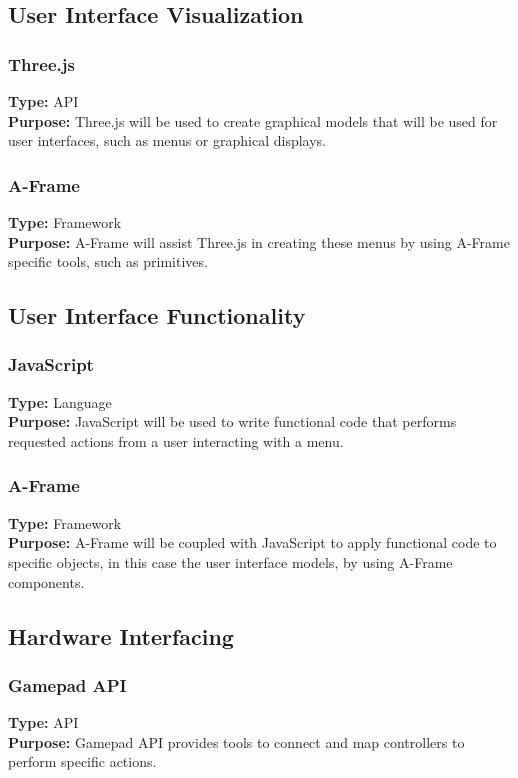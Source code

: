 \documentclass[onecolumn, draftclsnofoot,10pt, compsoc]{IEEEtran}
\begin{document}
\subsection{User Interface Visualization}
\subsubsection{Three.js}
\textbf{Type:} API\\
\textbf{Purpose:} Three.js will be used to create graphical models that will be used for user interfaces, such as menus or graphical displays.

\subsubsection{A-Frame}
\textbf{Type:} Framework\\ 
\textbf{Purpose:} A-Frame will assist Three.js in creating these menus by using A-Frame specific tools, such as primitives.

\subsection{User Interface Functionality}
\subsubsection{JavaScript}
\textbf{Type:} Language\\
\textbf{Purpose:} JavaScript will be used to write functional code that performs requested actions from a user interacting with a menu.

\subsubsection{A-Frame}
\textbf{Type:} Framework\\
\textbf{Purpose:} A-Frame will be coupled with JavaScript to apply functional code to specific objects, in this case the user interface models, by using A-Frame components.

\subsection{Hardware Interfacing}
\subsubsection{Gamepad API}
\textbf{Type:} API\\
\textbf{Purpose:} Gamepad API provides tools to connect and map controllers to perform specific actions.
\end{document}
